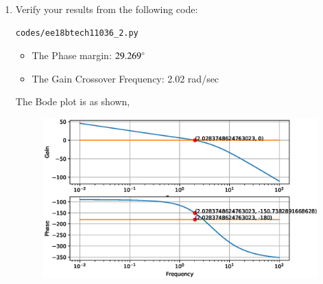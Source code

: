 \begin{enumerate}[label=\thesection.\arabic*.,ref=\thesection.\theenumi]
\begin{figure}[!ht]
    \centering
	\resizebox{\columnwidth}{!}{}
\caption{}
\label{fig:ee18btech11036_fin}
\end{figure}


\item
Verify your results from the following code:
\begin{lstlisting}
codes/ee18btech11036_2.py
\end{lstlisting}
\begin{itemize}
    \item The Phase margin: $29.269\degree$
    \item The Gain Crossover Frequency: 2.02 rad/sec
\end{itemize}
%
The Bode plot is as shown,
\begin{figure}[!ht]
  \centering
  \includegraphics[width=\columnwidth]{./figs/ee18btech11036_2.eps}
  \caption{}
  \label{fig:ee18btech11036_2}
\end{figure}


\end{enumerate}

